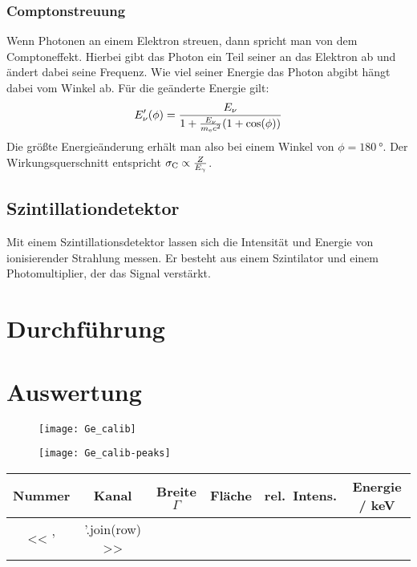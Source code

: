 \documentclass[11pt, ngerman, fleqn, DIV=15, headinclude, BCOR=2cm]{scrreprt}
\newcommand{\plotwidth}{0.8\linewidth}
\begin{document}
\subsection{Comptonstreuung}
Wenn Photonen an einem Elektron streuen, dann spricht man von dem
Comptoneffekt. 
Hierbei gibt das Photon ein Teil seiner an das Elektron ab und ändert dabei
seine Frequenz.
Wie viel seiner Energie das Photon abgibt hängt dabei vom Winkel ab.
Für die geänderte Energie gilt:
\[
    E_\nu'(\phi) = \frac{E_\nu}{1+\frac{E_\nu}{m_\text ec^2}(1+\cos(\phi))}
\]
Die größte Energieänderung erhält man also bei einem Winkel von
$\phi=\SI{180}{\degree}$.
Der Wirkungsquerschnitt entspricht $\sigma_\text C \propto \frac{Z}{E_\gamma}$.

\section{Szintillationdetektor}
Mit einem Szintillationsdetektor lassen sich die Intensität und Energie von
ionisierender Strahlung messen.
Er besteht aus einem Szintilator und einem Photomultiplier, der das Signal
verstärkt.


\chapter{Durchführung}


\chapter{Auswertung}


\begin{figure}
    \centering
    \texttt{[image: Ge\_calib]}
    \caption{%
    }
    \label{fig:}
\end{figure}

\begin{figure}
    \centering
    \texttt{[image: Ge\_calib-peaks]}
    \caption{%
    }
    \label{fig:}
\end{figure}

\begin{tabular}{SSSSSS}
    {Nummer} & {Kanal} & {Breite $\Gamma$} & {Fläche} & {rel.\ Intens.} &
    {Energie / \si{\kilo\electronvolt}} \\
    \midrule
    << ' & '.join(row) >> \\
\end{tabular}
\end{document}
